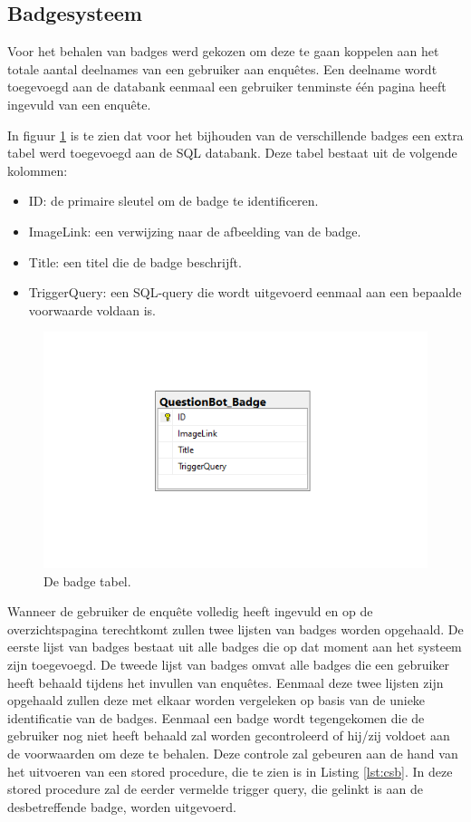 \subsection{Badgesysteem}

Voor het behalen van badges werd gekozen om deze te gaan koppelen aan het totale aantal deelnames van een gebruiker aan enquêtes. Een deelname wordt toegevoegd aan de databank eenmaal een gebruiker tenminste één pagina heeft ingevuld van een enquête.

In figuur \ref{fig:dbbadge} is te zien dat voor het bijhouden van de verschillende badges een extra tabel werd toegevoegd aan de SQL databank. Deze tabel bestaat uit de volgende kolommen:

\begin{itemize}
    \item ID: de primaire sleutel om de badge te identificeren.
    \item ImageLink: een verwijzing naar de afbeelding van de badge.
    \item Title: een titel die de badge beschrijft.
    \item TriggerQuery: een SQL-query die wordt uitgevoerd eenmaal aan een bepaalde voorwaarde voldaan is.
\end{itemize}

\begin{figure}
    \includegraphics[width=\linewidth]{DBBadge2.png}
    \caption{De badge tabel.}
    \label{fig:dbbadge}
\end{figure}

Wanneer de gebruiker de enquête volledig heeft ingevuld en op de overzichtspagina terechtkomt zullen twee lijsten van badges worden opgehaald. De eerste lijst van badges bestaat uit alle badges die op dat moment aan het systeem zijn toegevoegd. De tweede lijst van badges omvat alle badges die een gebruiker heeft behaald tijdens het invullen van enquêtes. Eenmaal deze twee lijsten zijn opgehaald zullen deze met elkaar worden vergeleken op basis van de unieke identificatie van de badges. Eenmaal een badge wordt tegengekomen die de gebruiker nog niet heeft behaald zal worden gecontroleerd of hij/zij voldoet aan de voorwaarden om deze te behalen. Deze controle zal gebeuren aan de hand van het uitvoeren van een stored procedure, die te zien is in Listing \ref{lst:csb}. In deze stored procedure zal de eerder vermelde trigger query, die gelinkt is aan de desbetreffende badge, worden uitgevoerd.


